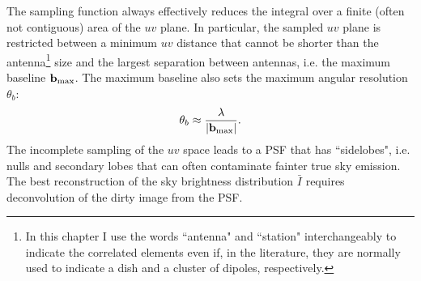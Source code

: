 The sampling function always effectively reduces the integral over a finite (often not contiguous) area of the $uv$ plane. In particular, the sampled $uv$ plane is restricted between a minimum $uv$ distance that cannot be shorter than the antenna\footnote{In this chapter I use the words ``antenna" and ``station" interchangeably to indicate the correlated elements even if, in the literature, they are normally used to indicate a dish and a cluster of dipoles, respectively.} size and the largest separation between antennas, i.e. the maximum baseline ${\bf b}_{\rm max}$. The maximum baseline also sets the maximum angular resolution $\theta_b$:
\begin{equation}
\theta_b \approx \frac{\lambda}{|{\bf b}_{\rm max}|}.
\label{eq:8}
\end{equation}
The incomplete sampling of the $uv$ space leads to a PSF that has ``sidelobes", i.e. nulls and secondary lobes that can often contaminate fainter true sky emission. The best reconstruction of the sky brightness distribution ${\bar I}$ requires deconvolution of the dirty image from the PSF. 

